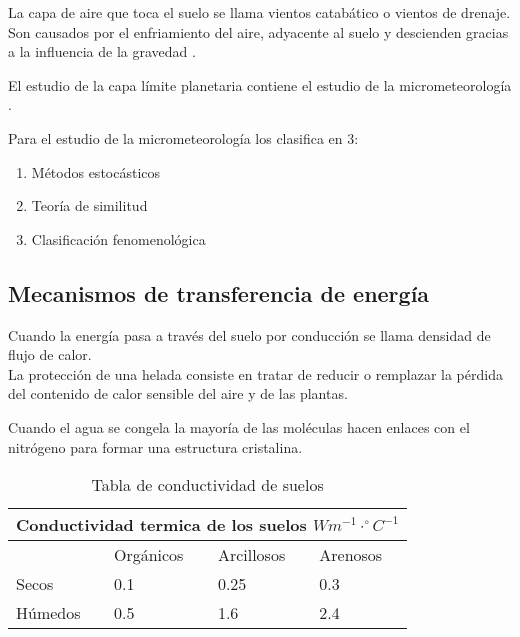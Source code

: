 La capa de aire que toca el suelo se llama vientos catabático o vientos de drenaje. Son causados por el enfriamiento del aire, adyacente al suelo y descienden gracias a la influencia de la gravedad \citep{Stull1988pbl}.

El estudio de la capa límite planetaria contiene el estudio de la micrometeorología \citep{Stull1988pbl}.

Para el estudio de la micrometeorología \citet{Stull1988pbl} los clasifica en 3:

\begin{enumerate}
\item Métodos estocásticos
\item Teoría de similitud
\item Clasificación fenomenológica
\end{enumerate}




\subsection{Mecanismos de transferencia de energía}

Cuando la energía pasa a través del suelo por conducción se llama densidad de flujo de calor.\\
La protección de una helada consiste en tratar de reducir o remplazar la pérdida del contenido de calor sensible del aire y de las plantas.



Cuando el agua se congela la mayoría de las moléculas hacen enlaces con el nitrógeno para formar una estructura cristalina. 

\begin{table}[H]
\centering

\label{tabla_conductividad}
\begin{tabular}{@{}llll@{}}
\multicolumn{4}{l}{Conductividad termica de los suelos $W m^{-1}\cdot^{\circ}C^{-1} $} \\ \midrule
\multicolumn{1}{l|}{}         & Orgánicos  & Arcillosos & Arenosos \\ \midrule
\multicolumn{1}{l|}{Secos}    & 0.1        & 0.25       & 0.3      \\
\multicolumn{1}{l|}{Húmedos}  & 0.5        & 1.6        & 2.4     

\end{tabular}
\caption{Tabla de conductividad de suelos}
\end{table}


